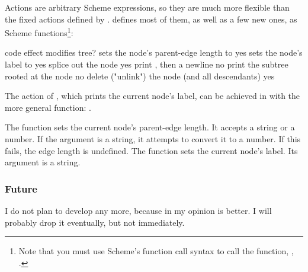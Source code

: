 Actions are arbitrary Scheme expressions, so they are much more flexible than
the fixed actions defined by \ed. \sched{} defines most of them, as well as a
few new ones, as Scheme functions\footnote{Note that you must use Scheme's function call syntax to call the function, \ie, .}:

\startalignment[center]
\starttabulate[|c|l|c|]
code \NC effect \NC modifies tree?\NC\NR
\HL
{}	\NC sets the node's parent-edge length to 	\NC yes \NC\NR
{}	\NC sets the node's label to 	\NC yes \NC\NR
{} 				\NC splice out the node 									\NC yes \NC\NR
{} 	\NC print , then a newline 		\NC no \NC\NR
{} 				\NC print the subtree rooted at the node 	\NC no \NC\NR
{} 				\NC delete ("unlink") the node (and all descendants) \NC yes \NC\NR
\stoptabulate
\stopalignment

The  action of \ed{}, which prints the current node's
label, can be achieved in \sched{} with the more general  function:
.

The  function sets the current node's parent-edge length. It accepts
a string or a number. If the argument is a string, it attempts to convert it to
a number. If this fails, the edge length is undefined. The 
function sets the current node's label. Its argument is a string.

\subsubsection{Future}

I do not plan to develop \sched{} any more, because in my opinion \luaed{} is
better. I will probably drop it eventually, but not immediately.
